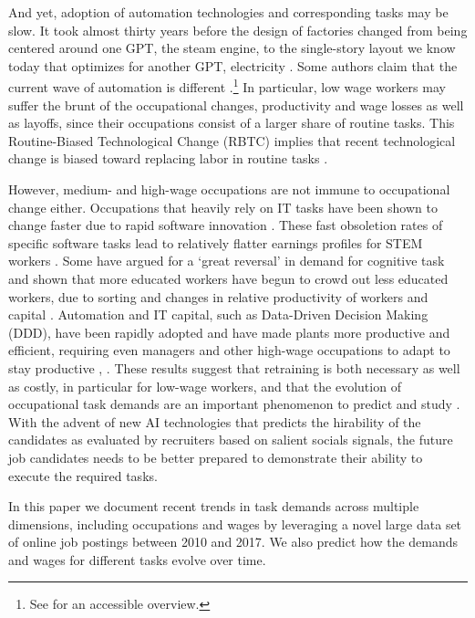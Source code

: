 \documentclass[letterpaper]{article} %
\begin{document}
\par
And yet, adoption of automation technologies and corresponding tasks may be slow. It took almost thirty years before the design of factories changed from being centered around one GPT, the steam engine, to the single-story layout we know today that optimizes for another GPT, electricity \cite{BrynjolfssonMcAfee2014}. Some authors claim that the current wave of automation is different \cite{duckworth2019inferring}.\footnote{See \cite{wajcman2017automation} for an accessible overview.}
In particular, low wage workers may suffer the brunt of the occupational changes, productivity and wage losses as well as layoffs, since their occupations consist of a larger share of routine tasks. This Routine-Biased Technological Change (RBTC) implies that recent technological change is biased toward replacing labor in routine tasks \cite{GoosManningSalomons2014}. 

However, medium- and high-wage occupations are not immune to occupational change either. Occupations that heavily rely on IT tasks have been shown to change faster due to rapid software innovation \cite{Hershbein2018}. These fast obsoletion rates of specific software tasks lead to relatively flatter earnings profiles for STEM workers \cite{Deming2018a}. Some have argued for a `great reversal' in demand for cognitive task and shown that more educated workers have begun to crowd out less educated workers, due to sorting and changes in relative productivity of workers and capital \cite{BeaudryGreenSand2015}. Automation and IT capital, such as Data-Driven Decision Making (DDD), have been rapidly adopted and have made plants more productive and efficient, requiring even managers and other high-wage occupations to adapt to stay productive \cite{Brynjolfsson2016}, \cite{Bartel2007}. These results suggest that retraining is both necessary as well as costly, in particular for low-wage workers, and that the evolution of occupational task demands are an important phenomenon to predict and study \cite{atalay2019evolution}. With the advent of new AI technologies \cite{hemamou2019hirenet} that predicts the hirability of the candidates as evaluated by recruiters based on salient socials signals, the future job candidates needs to be better prepared to demonstrate their ability to execute the required tasks.
\par
In this paper we document recent trends in task demands across multiple dimensions, including occupations and wages by leveraging a novel large data set of online job postings between 2010 and 2017. We also predict how the demands and wages for different tasks evolve over time.
\end{document}

